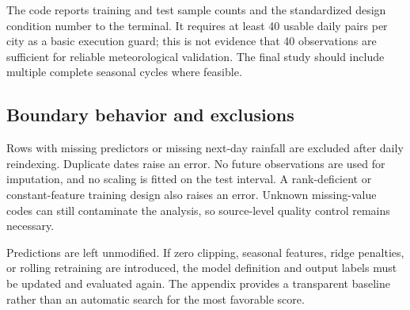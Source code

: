 \documentclass[11pt,a4paper]{article}
\begin{document}
The code reports training and test sample counts and the standardized design condition number to the terminal. It requires at least 40 usable daily pairs per city as a basic execution guard; this is not evidence that 40 observations are sufficient for reliable meteorological validation. The final study should include multiple complete seasonal cycles where feasible.

\subsection{Boundary behavior and exclusions}
Rows with missing predictors or missing next-day rainfall are excluded after daily reindexing. Duplicate dates raise an error. No future observations are used for imputation, and no scaling is fitted on the test interval. A rank-deficient or constant-feature training design also raises an error. Unknown missing-value codes can still contaminate the analysis, so source-level quality control remains necessary.

Predictions are left unmodified. If zero clipping, seasonal features, ridge penalties, or rolling retraining are introduced, the model definition and output labels must be updated and evaluated again. The appendix provides a transparent baseline rather than an automatic search for the most favorable score.
\end{document}
